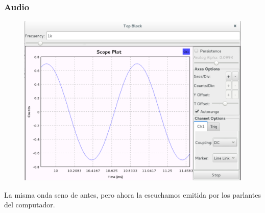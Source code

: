 \begin{frame}[fragile]
\frametitle{Audio}
\justifying

\begin{figure}

\begin{center}
\includegraphics[scale=0.25]{lab3/pdf/lab33.pdf}

\end{center}

\end{figure}

\justifying
La misma onda seno de antes, pero ahora la escuchamos emitida
por los parlantes del computador.

\end{frame}

